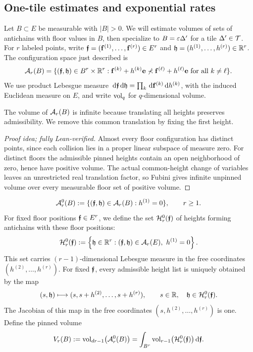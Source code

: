 \documentclass[11pt,letterpaper]{article}
\begin{document}
\subsection{One-tile estimates and exponential rates}

Let $B\subset E$ be measurable with $|B|>0$. We will estimate volumes of sets of antichains with floor values in $B$, then specialize to $B=\varepsilon\Delta'$ for a tile $\Delta'\in\mathcal T$.
For $r$ labeled points, write $\bm{\mathfrak f}=(\mathbf f^{(1)},\ldots,\mathbf f^{(r)})\in E^r$ and $\mathfrak h=(h^{(1)},\ldots,h^{(r)})\in\mathbb R^r$. The configuration space just described is
\begin{equation}\label{eq:A_n_of_B_definition}
      \mathcal A_r(B)=\{(\bm{\mathfrak f},\mathfrak h)\in B^r\times\mathbb R^r:
      \mathbf f^{(k)}+h^{(k)}\mathbf e\not\prec\mathbf f^{(\ell)}+h^{(\ell)}\mathbf e\text{ for all }k\ne\ell\}.
\end{equation}
We use product Lebesgue measure $\,\mathrm d\bm{\mathfrak f}\,\mathrm d\mathfrak h=\prod_k\,\mathrm d\mathbf f^{(k)}\,\mathrm d h^{(k)}$, with the induced Euclidean measure on $E$, and write $\operatorname{vol}_q$ for $q$-dimensional volume.

The volume of $\mathcal A_r(B)$ is infinite because translating all heights preserves admissibility. We remove this common translation by fixing the first height.

\begin{proof}[Proof idea; fully Lean-verified]
Almost every floor configuration has distinct points, since each collision lies in a proper linear subspace of measure zero. For distinct floors the admissible pinned heights contain an open neighborhood of zero, hence have positive volume. The actual common-height change of variables leaves an unrestricted real translation factor, so Fubini gives infinite unpinned volume over every measurable floor set of positive volume.
\end{proof}
\begin{equation}\label{eq:pinned-set}
      \mathcal A_r^0(B):=\{(\bm{\mathfrak f},\mathfrak h)\in\mathcal A_r(B):h^{(1)}=0\},\qquad r\ge1.
\end{equation}
For fixed floor positions $\bm{\mathfrak f}\in E^r$, we define the set $\mathcal H_r^0(\bm{\mathfrak f})$ of heights forming antichains with these floor positions:
\[
      \mathcal H_r^0(\bm{\mathfrak f}):= \left\{\mathfrak h\in\mathbb R^r:(\bm{\mathfrak f},\mathfrak h)\in\mathcal A_r(E),\ h^{(1)}=0\right\}.
\]
This set carries $(r-1)$-dimensional Lebesgue measure in the free coordinates $(h^{(2)},\ldots,h^{(r)})$. For fixed $\bm{\mathfrak f}$, every admissible height list is uniquely obtained by the map
\[
      (s,\mathfrak h)\longmapsto (s,s+h^{(2)},\ldots,s+h^{(r)}), \qquad s\in\mathbb R,\quad\mathfrak h\in\mathcal H_r^0(\bm{\mathfrak f}).
\]
The Jacobian of this map in the free coordinates $(s,h^{(2)},\ldots,h^{(r)})$ is one. Define the pinned volume
\begin{equation}\label{eq:slice}
      V_r(B):=\operatorname{vol}_{dr-1}\bigl(\mathcal A_r^0(B)\bigr)
      =\int_{B^r} \operatorname{vol}_{r-1}\bigl(\mathcal H_r^0(\bm{\mathfrak f})\bigr)\,\mathrm d\bm{\mathfrak f}.
\end{equation}
\end{document}
